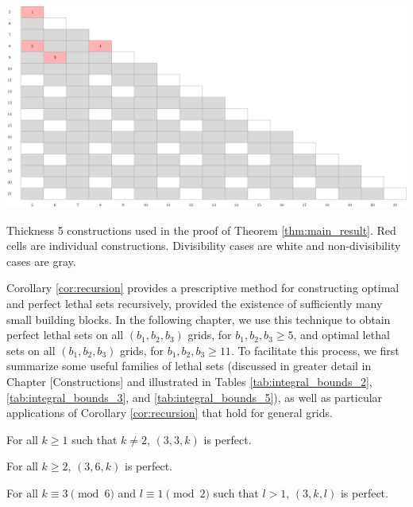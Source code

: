 \begin{table}[]
\centering
\includegraphics[width=\textwidth]{tables/2/thickness_5.pdf}
\caption{Thickness 5 constructions used in the proof of Theorem \ref{thm:main_result}. Red cells are individual constructions. Divisibility cases are white and non-divisibility cases are gray.}
\label{tab:integral_bounds_5}
\end{table}

Corollary \ref{cor:recursion} provides a prescriptive method for constructing optimal and perfect lethal sets recursively, provided the existence of sufficiently many small building blocks. In the following chapter, we use this technique to obtain perfect lethal sets on all $(b_1,b_2,b_3)$ grids, for $b_1,b_2,b_3 \geq 5$, and optimal lethal sets on all $(b_1,b_2,b_3)$ grids, for $b_1,b_2,b_3 \geq 11$. To facilitate this process, we first summarize some useful families of lethal sets (discussed in greater detail in Chapter [Constructions] and illustrated in Tables \ref{tab:integral_bounds_2}, \ref{tab:integral_bounds_3}, and \ref{tab:integral_bounds_5}), as well as particular applications of Corollary \ref{cor:recursion} that hold for general grids. 

\begin{prop}
\label{prop:3x3xk}
For all $k \geq 1$ such that $k \neq 2$, $(3,3,k)$ is perfect.
\end{prop}

\begin{prop}
\label{prop:3x6xk}
For all $k \geq 2$, $(3,6,k)$ is perfect.
\end{prop}

\begin{prop}
\label{prop:thickness_3_2d_family}
For all $k \equiv 3 \pmod 6$ and $l \equiv 1 \pmod 2$ such that $l >1$, $(3,k,l)$ is perfect.
\end{prop}

